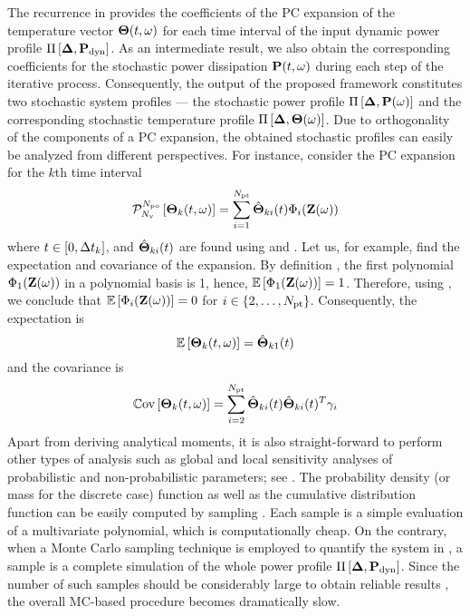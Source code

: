 The recurrence in  provides the coefficients of the PC expansion of the temperature vector ${\boldsymbol\Theta}(t, \omega)$ for each time interval of the input dynamic power profile $\prof{\mP_\dyn}$. As an intermediate result, we also obtain the corresponding coefficients for the stochastic power dissipation $\mathbf{P}(t, \omega)$ during each step of the iterative process. Consequently, the output of the proposed framework constitutes two stochastic system profiles --- the stochastic power profile $\prof{\mP(\o)}$ and the corresponding stochastic temperature profile $\Pi\left[\boldsymbol{\Delta}, {\boldsymbol\Theta}(\omega)\right]$. Due to orthogonality of the components of a PC expansion, the obtained stochastic profiles can easily be analyzed from different perspectives. For instance, consider the PC expansion for the $k$th time interval
\begin{equation} \elabel{pc-k}
  \oPC{\vars}{\pcorder}{\vTO_k(\t, \o)} = \sum_{i = 1}^{\pcterms} \pcc{\vTO}_{ki}(\t) \pcb_i(\vZ(\o))
\end{equation}
where $t \in [0, \Delta t_k]$, and $\hat{{\boldsymbol\Theta}}_{ki}(t)$ are found using  and . Let us, for example, find the expectation and covariance of the expansion. By definition \cite{xiu2002}, the first polynomial $\Phi_1(\mathbf{Z}(\omega))$ in a polynomial basis is 1, hence, $\mathbb{E}\left[\Phi_1(\mathbf{Z}(\omega))\right] = 1$. Therefore, using , we conclude that $\mathbb{E}\left[\Phi_i(\mathbf{Z}(\omega))\right] = 0$ for $i \in \{ 2, \dotsc, {N_\text{pt}} \}$. Consequently, the expectation is
\[
  \mathbb{E}\left[{\boldsymbol\Theta}_k(t, \omega)\right] = \hat{{\boldsymbol\Theta}}_{k1}(t)
\]
and the covariance is
\[
  \mathbb{C}\text{ov}\left[{\boldsymbol\Theta}_k(t, \omega)\right] = \sum_{i = 2}^{{N_\text{pt}}} \hat{{\boldsymbol\Theta}}_{ki}(t) \hat{{\boldsymbol\Theta}}_{ki}(t)^T \gamma_i
\]
Apart from deriving analytical moments, it is also straight-forward to perform other types of analysis such as global and local sensitivity analyses of probabilistic and non-probabilistic parameters; see \cite{eldred2009, maitre2010}. The probability density (or mass for the discrete case) function as well as the cumulative distribution function can be easily computed by sampling . Each sample is a simple evaluation of a multivariate polynomial, which is computationally cheap. On the contrary, when a Monte Carlo sampling technique is employed to quantify the system in , a sample is a complete simulation of the whole power profile $\prof{\mP_\dyn}$. Since the number of such samples should be considerably large to obtain reliable results \cite{xiu2009}, the overall MC-based procedure becomes dramatically slow.

